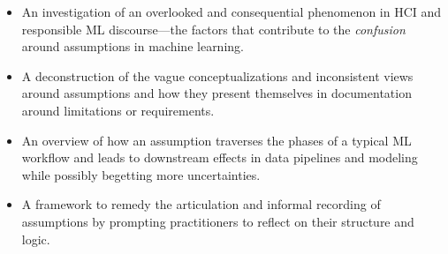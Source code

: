 \begin{itemize}
    \item An investigation of an overlooked and consequential phenomenon in HCI and responsible ML discourse---the factors that contribute to the \textit{confusion} around assumptions in machine learning.
    \item A deconstruction of the vague conceptualizations and inconsistent views around assumptions and how they present themselves in documentation around limitations or requirements.
    \item An overview of how an assumption traverses the phases of a typical ML workflow and leads to downstream effects in data pipelines and modeling while possibly begetting more uncertainties.
    \item A framework to remedy the articulation and informal recording of assumptions by prompting practitioners to reflect on their structure and logic.
\end{itemize}



